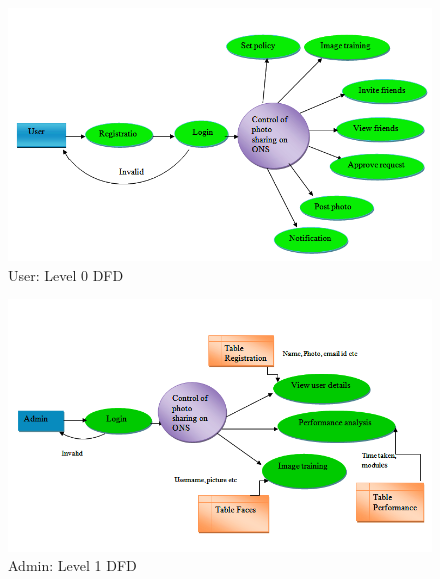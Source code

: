 \begin{figure}[H]
\begin{minipage}[c]{1\linewidth}
\begin{center}
\includegraphics[width=\textwidth]{nndfd2.png}
           \caption[User: level 0 DFD]{ User: Level 0 DFD}
             \label{Posted photo on time line of Social Networking site}
\end{center}
  \end{minipage}            
\end{figure}
\begin{figure}[H]
\begin{minipage}[c]{1\linewidth}
\begin{center}
\includegraphics[width=\textwidth]{ndfd4.png}
           \caption[Admin: Level 1 DFD]{ Admin: Level 1 DFD}
             \label{Posted photo on time line of Social Networking site}
\end{center}
  \end{minipage}            
\end{figure}
